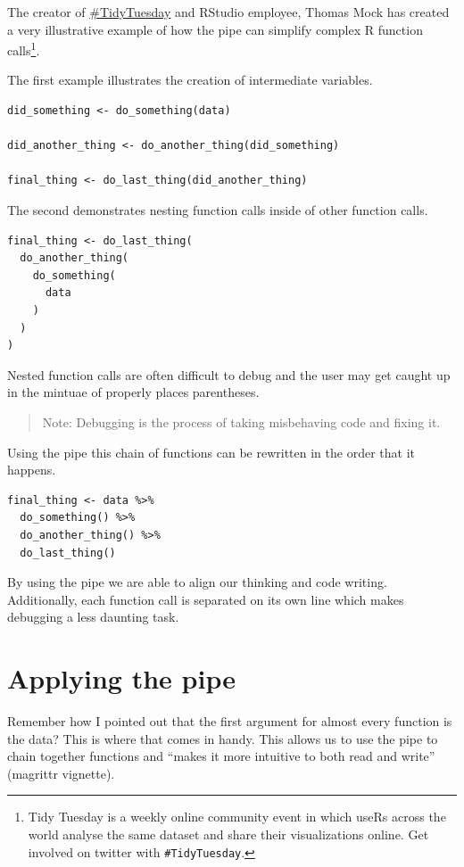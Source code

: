 \documentclass[
]{book}
\begin{document}
The creator of \href{https://github.com/rfordatascience/tidytuesday}{\#TidyTuesday} and RStudio employee, Thomas Mock has created a very illustrative example of how the pipe can simplify complex R function calls\footnote{Tidy Tuesday is a weekly online community event in which useRs across the world analyse the same dataset and share their visualizations online. Get involved on twitter with \texttt{\#TidyTuesday}.}.

The first example illustrates the creation of intermediate variables.

\begin{verbatim}
did_something <- do_something(data)

did_another_thing <- do_another_thing(did_something)

final_thing <- do_last_thing(did_another_thing)
\end{verbatim}

The second demonstrates nesting function calls inside of other function calls.

\begin{verbatim}
final_thing <- do_last_thing(
  do_another_thing(
    do_something(
      data
    )
  )
)
\end{verbatim}

Nested function calls are often difficult to debug and the user may get caught up in the mintuae of properly places parentheses.

\begin{quote}
Note: Debugging is the process of taking misbehaving code and fixing it.
\end{quote}

Using the pipe this chain of functions can be rewritten in the order that it happens.

\begin{verbatim}
final_thing <- data %>% 
  do_something() %>% 
  do_another_thing() %>% 
  do_last_thing()
\end{verbatim}

By using the pipe we are able to align our thinking and code writing. Additionally, each function call is separated on its own line which makes debugging a less daunting task.

\hypertarget{applying-the-pipe}{%
\section{Applying the pipe}\label{applying-the-pipe}}

Remember how I pointed out that the first argument for almost every function is the data? This is where that comes in handy. This allows us to use the pipe to chain together functions and ``makes it more intuitive to both read and write'' (magrittr vignette).
\end{document}
